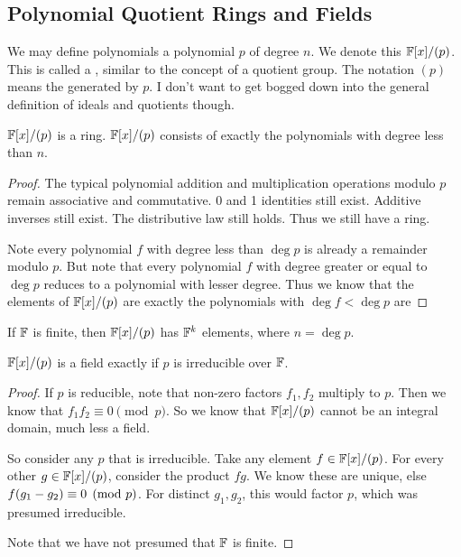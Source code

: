 \subsection{Polynomial Quotient Rings and Fields}

\begin{definition}
  We may define polynomials  a polynomial $p$ of degree
  $n$. We denote this $\mathbb{F}[x]/(p)$. This is called a , similar to the concept of a quotient group. The notation $(p)$
  means the  generated by $p$. I don't want to get bogged
  down into the general definition of ideals and quotients though.
\end{definition}

\begin{proposition}
  $\mathbb{F}[x]/(p)$ is a ring. $\mathbb{F}[x]/(p)$ consists of exactly the polynomials
  with degree less than $n$.
\end{proposition}

\begin{proof}
  The typical polynomial addition and multiplication operations modulo
  $p$ remain associative and commutative. 0 and 1 identities still
  exist. Additive inverses still exist. The distributive law still
  holds. Thus we still have a ring.

  Note every polynomial $f$ with degree less than $\deg p$ is already a
  remainder modulo $p$. But note that every polynomial $f$ with degree
  greater or equal to $\deg p$ reduces to a polynomial with lesser
  degree. Thus we know that the elements of $\mathbb{F}[x]/(p)$ are exactly the
  polynomials with $\deg f < \deg p$ are
\end{proof}

\begin{corollary}
  If $\mathbb{F}$ is finite, then $\mathbb{F}[x]/(p)$ has $\mathbb{F}^k$ elements, where $n =
  \deg p$.
\end{corollary}

\begin{proposition}
  $\mathbb{F}[x]/(p)$ is a field exactly if $p$ is irreducible over $\mathbb{F}$.
\end{proposition}

\begin{proof}
  If $p$ is reducible, note that non-zero factors $f_1, f_2$ multiply to
  $p$. Then we know that $f_1 f_2 \equiv 0 \pmod{p}$. So we know that
  $\mathbb{F}[x]/(p)$ cannot be an integral domain, much less a field.

  So consider any $p$ that is irreducible. Take any element $f \in
  \mathbb{F}[x]/(p)$. For every other $g \in \mathbb{F}[x]/(p)$, consider the product $f
  g$. We know these are unique, else $f \mathopen{}\left( {g_1 - g_2} \right)\mathclose{} \equiv 0
  \pmod{p}$. For distinct $g_1, g_2$, this would factor $p$, which was
  presumed irreducible.

  Note that we have not presumed that $\mathbb{F}$ is finite.
\end{proof}

